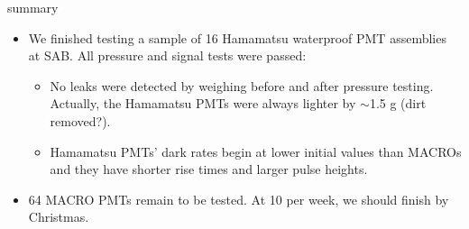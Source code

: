 \documentclass{beamer}
\begin{document}
\begin{frame}{summary}
	\begin{itemize}
		\item We finished testing a sample of 16 Hamamatsu waterproof PMT assemblies at SAB.
		All pressure and signal tests were passed:
		\begin{itemize}
			\item No leaks were detected by weighing before and after pressure testing.
			Actually, the Hamamatsu PMTs were always lighter by $\sim$1.5 g (dirt removed?).
			\item Hamamatsu PMTs' dark rates begin at lower initial values than MACROs
			and they have shorter rise times and larger pulse heights.
		\end{itemize}
		\item 64 MACRO PMTs remain to be tested. At 10 per week, we should finish by Christmas.
	\end{itemize}
\end{frame}
\end{document}

